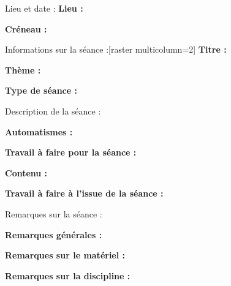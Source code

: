 \documentclass[a4paper,11pt,fleqn]{article}
\begin{document}
\setcounter{pagecounter}{0}
\setcounter{ExoMA}{0}

\def\points{\phantom{AAA}}
\def\difficulty{\phantom{AAA}}
\chapitre[
    ]{
    }{
    }{
    }{
    }{
    }

\begin{tcolorbox}[blank]
	\begin{Colonnes}{3}
		\begin{bfbox}{Lieu et date :}
			\textbf{Lieu :} %
		    
		    
			\textbf{Créneau :} %
		\end{bfbox}
		\begin{bfbox}{Informations sur la séance :}[raster multicolumn=2]
			\textbf{Titre :} %
		
		
		
			\textbf{Thème :} %
		
		
		
			\textbf{Type de séance :} %
		\end{bfbox}
	\end{Colonnes}
\end{tcolorbox}
\begin{bfbox}{Description de la séance :}

	\textbf{Automatismes :} %
	
	\textbf{Travail à faire pour la séance :} 
	\begin{itemize}[label=$\bullet$]
	\end{itemize}
	
	\textbf{Contenu :} 
	\begin{itemize}[label=$\bullet$]

	\end{itemize}
	\textbf{Travail à faire à l'issue de la séance :} 
	\begin{itemize}[label=$\bullet$]
	\end{itemize}
	\vspace{2cm}
\end{bfbox}

\begin{bfbox}{Remarques sur la séance :}

\textbf{Remarques générales :} 






\textbf{Remarques sur le matériel :}





\textbf{Remarques sur la discipline :}




\end{bfbox}
\end{document}
